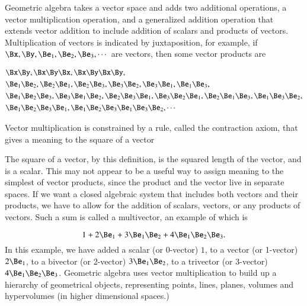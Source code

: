 %
%
Geometric algebra takes a vector space and adds two additional operations, a vector multiplication operation, and a generalized addition operation that extends vector addition to include addition of scalars and products of vectors.
Multiplication of vectors is indicated by juxtaposition, for example, if \( \Bx, \By, \Be_1, \Be_2, \Be_3, \cdots \) are vectors, then some vector products are

\begin{dmath}\label{eqn:multivector:20}
\begin{aligned}
&\Bx \By, \Bx \By \Bx, \Bx \By \Bx \By, \\
&\Be_1 \Be_2, \Be_2 \Be_1, \Be_2 \Be_3, \Be_3 \Be_2, \Be_3 \Be_1, \Be_1 \Be_3, \\
&\Be_1 \Be_2 \Be_3, \Be_3 \Be_1 \Be_2, \Be_2 \Be_3 \Be_1, \Be_3 \Be_2 \Be_1, \Be_2 \Be_1 \Be_3, \Be_1 \Be_3 \Be_2, \\
&\Be_1 \Be_2 \Be_3 \Be_1, \Be_1 \Be_2 \Be_3 \Be_1 \Be_3 \Be_2, \cdots
\end{aligned}
\end{dmath}

Vector multiplication is constrained by a rule, called the contraction axiom, that gives a meaning to the square of a vector

The square of a vector, by this definition, is the squared length of the vector, and is a scalar.
This may not appear to be a useful way to assign meaning to the simplest of vector products, since the product and the vector live in separate spaces.
If we want a closed algebraic system that includes both vectors and their products, we have to allow for the addition of scalars, vectors, or any products of vectors.  Such a sum is called a multivector, an example of which is

\begin{dmath}\label{eqn:multivector:40}
1 + 2 \Be_1 + 3 \Be_1 \Be_2 + 4 \Be_1 \Be_2 \Be_3.
\end{dmath}
In this example, we have added a
scalar (or 0-vector) \( 1 \), to a
vector (or 1-vector) \( 2 \Be_1 \), to a
bivector (or 2-vector) \( 3 \Be_1 \Be_2 \), to a
trivector (or 3-vector) \( 4 \Be_1 \Be_2 \Be_3 \).
Geometric algebra uses vector multiplication to build up a hierarchy of geometrical objects, representing points, lines, planes, volumes and hypervolumes (in higher dimensional spaces.)


